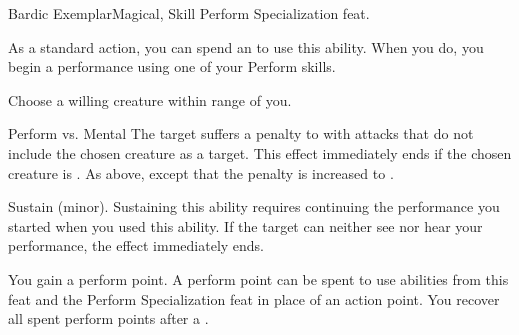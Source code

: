     \begin{feat}{Bardic Exemplar}{Magical, Skill}
        \featpre Perform Specialization feat.
        \featben

         As a standard action, you can spend an  to use this ability.
        When you do, you begin a performance using one of your Perform skills.
        \begin{ability}
            \begin{spelltargetinginfo}
                \spellspecial Choose a willing creature within range of you.
            \end{spelltargetinginfo}
            \begin{spelleffects}
                \begin{spellattack}{Perform vs. Mental}
                    \spellsuccess The target suffers a  penalty to  with attacks that do not include the chosen creature as a target.
                    This effect immediately ends if the chosen creature is .
                    \spellcritical As above, except that the penalty is increased to .
                \end{spellattack}
                \spelldur Sustain (minor). Sustaining this ability requires continuing the performance you started when you used this ability. If the target can neither see nor hear your performance, the effect immediately ends.
            \end{spelleffects}
        \end{ability}

         You gain a perform point.
        A perform point can be spent to use  abilities from this feat and the Perform Specialization feat in place of an action point.
        You recover all spent perform points after a .


\end{feat}
